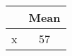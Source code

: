 {
\def\sym#1{\ifmmode^{#1}\else\(^{#1}\)\fi}
\begin{tabular}{l*{1}{c}}
\hline\hline
                    &        Mean\\
\hline
x                   &           57\\
\hline\hline
\end{tabular}
}
